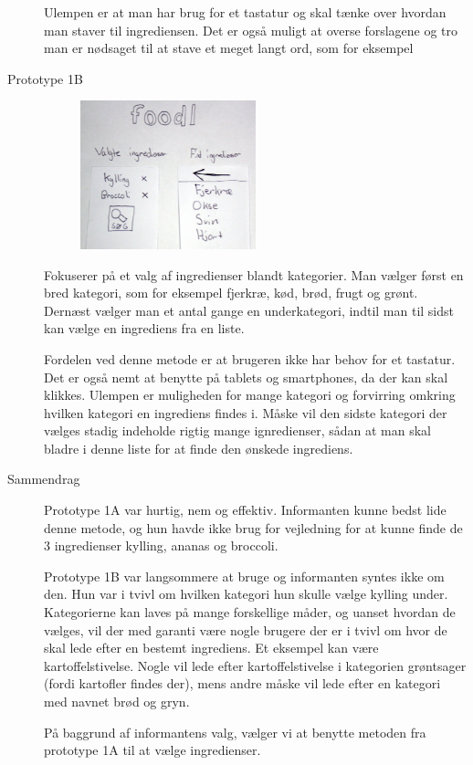\begin{description}
Ulempen er at man har brug for et tastatur og skal tænke over hvordan man staver til ingrediensen. Det er også muligt at overse forslagene og tro man er nødsaget til at stave et meget langt ord, som for eksempel 

\item[Prototype 1B]

\begin{figure}[H]
\centering
\includegraphics[width=0.5\textwidth]{billeder/prototyper/prototype1b.jpg}
\label{fig:prototype1b}
\end{figure}

Fokuserer på et valg af ingredienser blandt kategorier. Man vælger først en bred kategori, som for eksempel fjerkræ, kød, brød, frugt og grønt. Dernæst vælger man et antal gange en underkategori, indtil man til sidst kan vælge en ingrediens fra en liste.

Fordelen ved denne metode er at brugeren ikke har behov for et tastatur. Det er også nemt at benytte på tablets og smartphones, da der kan skal klikkes. Ulempen er muligheden for mange kategori og forvirring omkring hvilken kategori en ingrediens findes i. Måske vil den sidste kategori der vælges stadig indeholde rigtig mange ignredienser, sådan at man skal bladre i denne liste for at finde den ønskede ingrediens. 

\item[Sammendrag] Prototype 1A var hurtig, nem og effektiv. Informanten kunne bedst lide denne metode, og hun havde ikke brug for vejledning for at kunne finde de 3 ingredienser kylling, ananas og broccoli.

Prototype 1B var langsommere at bruge og informanten syntes ikke om den. Hun var i tvivl om hvilken kategori hun skulle vælge kylling under. Kategorierne kan laves på mange forskellige måder, og uanset hvordan de vælges, vil der med garanti være nogle brugere der er i tvivl om hvor de skal lede efter en bestemt ingrediens. Et eksempel kan være kartoffelstivelse. Nogle vil lede efter kartoffelstivelse i kategorien grøntsager (fordi kartofler findes der), mens andre måske vil lede efter en kategori med navnet brød og gryn.

På baggrund af informantens valg, vælger vi at benytte metoden fra prototype 1A til at vælge ingredienser.
\end{description}
